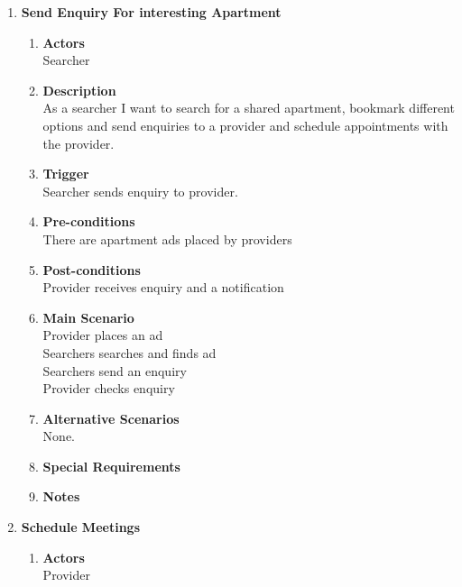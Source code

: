 \documentclass{scrreprt}
\begin{document}
\begin{enumerate}
	\item \textbf{Send Enquiry For interesting Apartment}
	\begin{enumerate}
		\item \textbf{Actors}  \\
			Searcher  \\

		\item \textbf{Description} \\
			As a searcher I want to search for a shared apartment, bookmark different options and send enquiries to a provider and schedule appointments with the provider.\\

		\item \textbf{Trigger} \\
			Searcher sends enquiry to provider.\\

		\item \textbf{Pre-conditions} \\
			There are apartment ads placed by providers\\

		\item \textbf{Post-conditions} \\
			Provider receives enquiry and a notification\\

		\item \textbf{Main Scenario} \\
			Provider places an ad\\
			Searchers searches and finds ad\\
			Searchers send an enquiry\\
			Provider checks enquiry\\

		\item \textbf{Alternative Scenarios} \\
			None.\\

		\item \textbf{Special Requirements} \\

		\item \textbf{Notes}\\
	\end{enumerate}
	
	\item \textbf{Schedule Meetings}
	\begin{enumerate}
		\item \textbf{Actors}  \\
			Provider\\


\end{enumerate}
\end{enumerate}
\end{document}
